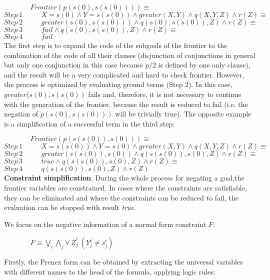 \documentclass{llncs}
\begin{document}
$~~~~~~~~~~~~~~~~~Frontier(p(s(0),s(s(0)))) \equiv $ \\
$Step~ 1~~~~~~~~~~~~{ X=s(0) \wedge Y=s(s(0)) \wedge
  greater(X,Y) \wedge q(X,Y,Z) \wedge r(Z) } \equiv $ \\
$Step~ 2~~~~~~~~~~~~{ greater(s(0),s(s(0))) \wedge q(s(0),s(s(0)),Z) \wedge r(Z) } \equiv $ \\
$Step~ 3~~~~~~~~~~~~{ fail  \wedge q(s(0),s(s(0)),Z) \wedge r(Z) } \equiv $ \\
$Step~ 4~~~~~~~~~~~~fail $ \\

The first step is to expand the code of the subgoals of the frontier
to the combination of the code of all their clauses (disjunction of
conjunctions in general but only one conjunction in this case because
$p/2$ is defined by one only clause), and the result will be a very
complicated and hard to check frontier.  However, the process is
optimized by evaluating ground terms (Step 2). In this case,
$greater(s(0),s(s(0))$ fails and, therefore, it is not necessary to
continue with the generation of the frontier, because the result is
reduced to fail (i.e. the negation of $p (s(0), s(s(0)))$ will be
trivially true). The opposite example is a simplification of a
successful term in the third step:

$~~~~~~~~~~~~~~~~~Frontier(p(s(s(0)),s(0))) \equiv $\\
$Step~ 1~~~~~~~~~~~~{ X=s(s(0)) \wedge Y=s(0) \wedge greater(X,Y) \wedge q(X,Y,Z) \wedge
  r(Z) } \equiv $ \\
$Step~ 2~~~~~~~~~~~~{ greater(s(s(0)),s(0)) \wedge q(s(s(0)),s(0),Z) \wedge r(Z) } \equiv
$ \\
$Step~ 3~~~~~~~~~~~~{ true \wedge q(s(s(0)),s(0),Z) \wedge r(Z) } \equiv $ \\
$Step~ 4~~~~~~~~~~~~{ q(s(s(0)),s(0),Z) \wedge r(Z) } $ \\

\noindent
{\bf Constraint simplification}. During the whole process for negating
a goal,the frontier variables are constrained. In cases where the
constraints are satisfiable, they can be eliminated and where the
constraints can be reduced to fail, the evaluation can be stopped with
result \emph{true}.
 
We focus on the negative information of a normal form constraint $F$:

$~~~~~~~~~~~~~~~~~ F \equiv  \bigvee_i\bigwedge_j \forall~ \overline{Z}_j^i~(Y_j^i \neq s_j^i)$

Firstly, the Prenex form \cite{Shoenfield} can be obtained by
extracting the universal variables with different names to the head of
the formula, applying logic rules:
\end{document}
